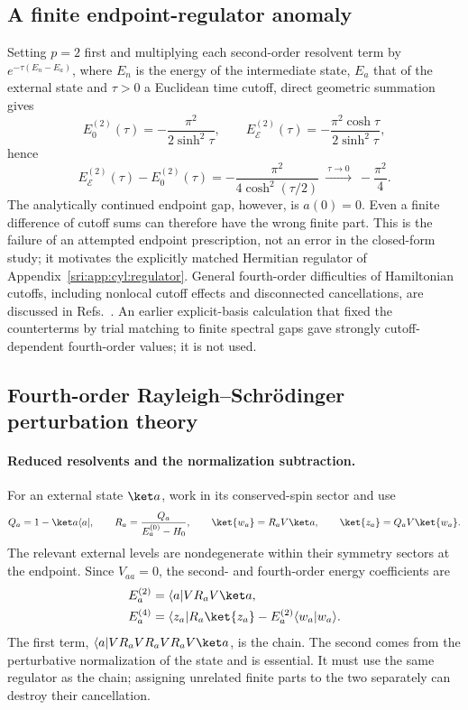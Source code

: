 \subsection{A finite endpoint-regulator anomaly}\label{sri:app:cyl:anomaly}
Setting $p=2$ first and multiplying each second-order resolvent term by $e^{-\tau(E_n-E_a)}$, where $E_n$ is the energy
of the intermediate state, $E_a$ that of the external state and $\tau>0$ a Euclidean time cutoff, direct geometric
summation gives
\begin{equation}
 E_0^{(2)}(\tau)=-\frac{\pi^2}{2\sinh^2\tau},\qquad
 E_{\mathcal E}^{(2)}(\tau)=-\frac{\pi^2\cosh\tau}{2\sinh^2\tau},
\end{equation}
hence
\begin{equation}
 E_{\mathcal E}^{(2)}(\tau)-E_0^{(2)}(\tau)=-\frac{\pi^2}{4\cosh^2(\tau/2)}\ \xrightarrow{\ \tau\to0\ }\ -\frac{\pi^2}{4}.
\end{equation}
The analytically continued endpoint gap, however, is $a(0)=0$. Even a finite difference of cutoff sums can therefore
have the wrong finite part. This is the failure of an attempted endpoint prescription, not an error in the closed-form
study; it motivates the explicitly matched Hermitian regulator of Appendix~\ref{sri:app:cyl:regulator}. General fourth-order
difficulties of Hamiltonian cutoffs, including nonlocal cutoff effects and disconnected cancellations, are discussed in
Refs.~\cite{sri:EliasMiro:2021,sri:EliasMiro:2022}. An earlier explicit-basis calculation that fixed the counterterms by trial
matching to finite spectral gaps gave strongly cutoff-dependent fourth-order values; it is not used.

\subsection{Fourth-order Rayleigh--Schr\"odinger perturbation theory}\label{sri:app:cyl:rs}
\paragraph{Reduced resolvents and the normalization subtraction.} For an external state $\ket a$, work in its
conserved-spin sector and use
\begin{equation}
 Q_a=1-\ket a\langle a\rvert,\qquad R_a=\frac{Q_a}{E_a^{(0)}-H_0},\qquad \ket{w_a}=R_aV\ket a,\qquad
 \ket{z_a}=Q_aV\ket{w_a}.
\end{equation}
The relevant external levels are nondegenerate within their symmetry sectors at the endpoint. Since $V_{aa}=0$, the
second- and fourth-order energy coefficients are
\begin{align}
 E_a^{(2)}&=\langle a\rvert VR_aV\ket a,\\
 E_a^{(4)}&=\langle z_a\rvert R_a\ket{z_a}-E_a^{(2)}\langle w_a\vert w_a\rangle.
 \label{sri:eq:cyl:RS4}
\end{align}
The first term, $\langle a\rvert VR_aVR_aVR_aV\ket a$, is the chain. The second comes from the perturbative
normalization of the state and is essential. It must use the same regulator as the chain; assigning unrelated finite
parts to the two separately can destroy their cancellation.

